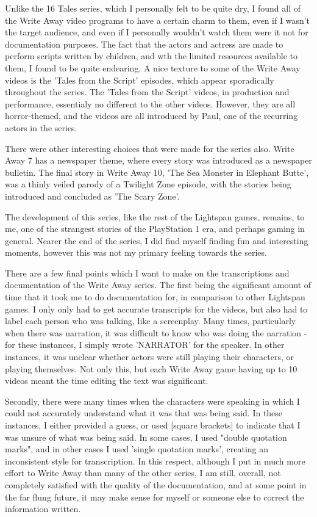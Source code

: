 Unlike the 16 Tales series, which I personally felt to be quite dry, I found all of the Write Away video programs to have a certain charm to them, even if I wasn't the target audience, and even if I personally wouldn't watch them were it not for documentation purposes. The fact that the actors and actress are made to perform scripts written by children, and wth the limited resources available to them, I found to be quite endearing. A nice texture to some of the Write Away videos is the 'Tales from the Script' episodes, which appear sporadically throughout the series. The 'Tales from the Script' videos, in production and performance, essentialy no different to the other videos. However, they are all horror-themed, and the videos are all introduced by Paul, one of the recurring actors in the series.

There were other interesting choices that were made for the series also. Write Away 7 has a newspaper theme, where every story was introduced as a newspaper bulletin. The final story in Write Away 10, 'The Sea Monster in Elephant Butte', was a thinly veiled parody of a Twilight Zone episode, with the stories being introduced and concluded as 'The Scary Zone'.

The development of this series, like the rest of the Lightspan games, remains, to me, one of the strangest stories of the PlayStation 1 era, and perhaps gaming in general. Nearer the end of the series, I did find myself finding fun and interesting moments, however this was not my primary feeling towards the series.

There are a few final points which I want to make on the transcriptions and documentation of the Write Away series. The first being the significant amount of time that it took me to do documentation for, in comparison to other Lightspan games. I only only had to get accurate transcripts for the videos, but also had to label each person who was talking, like a screenplay. Many times, particularly when there was narration, it was difficult to know who was doing the narration - for these instances, I simply wrote 'NARRATOR' for the speaker. In other instances, it was unclear whether actors were still playing their characters, or playing themselves. Not only this, but each Write Away game having up to 10 videos meant the time editing the text was significant.

Secondly, there were many times when the characters were speaking in which I could not accurately understand what it was that was being said. In these instances, I either provided a guess, or used [square brackets] to indicate that I was unsure of what was being said. In some cases, I used "double quotation marks", and in other cases I used 'single quotation marks', creating an inconsistent style for transcription. In this respect, although I put in much more effort to Write Away than many of the other series, I am still, overall, not completely satisfied with the quality of the documentation, and at some point in the far flung future, it may make sense for myself or someone else to correct the information written.

